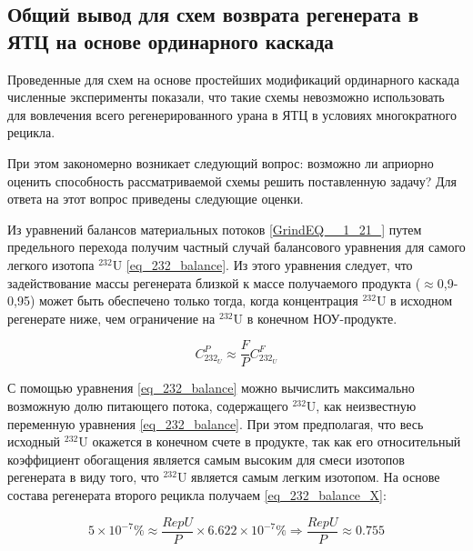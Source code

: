 \subsection{Общий вывод для схем возврата регенерата в ЯТЦ на основе ординарного каскада}

Проведенные для схем на основе простейших модификаций ординарного каскада численные эксперименты показали, что такие схемы невозможно использовать для вовлечения всего регенерированного урана в ЯТЦ в условиях многократного рецикла.

При этом закономерно возникает следующий вопрос: возможно ли априорно оценить способность рассматриваемой схемы решить поставленную задачу? Для ответа на этот вопрос приведены следующие оценки.

Из уравнений балансов материальных потоков \ref{GrindEQ__1_21_} путем предельного перехода получим частный случай балансового уравнения для самого легкого изотопа $^{232}$U \ref{eq_232_balance}. Из этого уравнения следует, что задействование массы регенерата близкой к массе получаемого продукта ($\approx$0,9-0,95) может быть обеспечено только тогда, когда концентрация $^{232}$U в исходном регенерате ниже, чем ограничение на $^{232}$U в конечном НОУ-продукте. 


\begin{equation}
\label{eq_232_balance}
  C_{232_{U}}^{P} \approx \frac{F}{P} C_{232_{U}}^{F}
\end{equation}

С помощью уравнения \ref{eq_232_balance} можно вычислить максимально возможную долю питающего потока, содержащего $^{232}$U, как неизвестную переменную уравнения \ref{eq_232_balance}. При этом предполагая, что весь исходный $^{232}$U окажется в конечном счете в продукте, так как его относительный коэффициент обогащения является самым высоким для смеси изотопов регенерата в виду того, что $^{232}$U является самым легким изотопом. На основе состава регенерата второго рецикла получаем \ref{eq_232_balance_X}:


\begin{equation}
  \label{eq_232_balance_X}
    5 \times 10^{-7} \% \approx \frac{RepU}{P} \times 6.622 \times 10^{-7} \% \Rightarrow \frac{RepU}{P} \approx 0.755
\end{equation}

